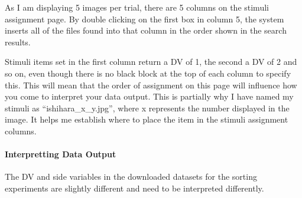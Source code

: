 \documentclass[]{book}
\let\oldparagraph\paragraph
\renewcommand{\paragraph}[1]{\oldparagraph{#1}\mbox{}}
\begin{document}
As I am displaying 5 images per trial, there are 5 columns on the
stimuli assignment page. By double clicking on the first box in column
5, the system inserts all of the files found into that column in the
order shown in the search results.

Stimuli items set in the first column return a DV of 1, the second a DV
of 2 and so on, even though there is no black block at the top of each
column to specify this. This will mean that the order of assignment on
this page will influence how you come to interpret your data output.
This is partially why I have named my stimuli as ``ishihara\_x\_y.jpg'',
where x represents the number displayed in the image. It helps me
establish where to place the item in the stimuli assignment columns.

\paragraph{Interpretting Data Output}\label{interpretting-data-output}

The DV and side variables in the downloaded datasets for the sorting
experiments are slightly different and need to be interpreted
differently.
\end{document}
